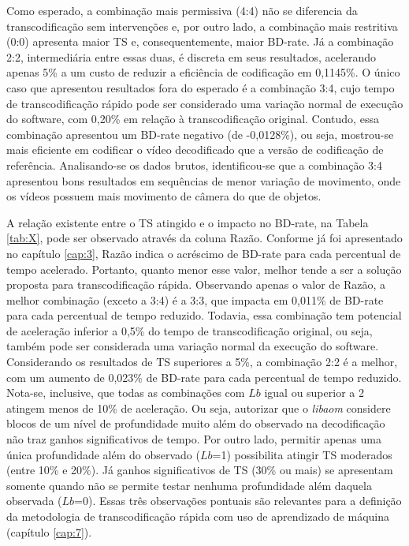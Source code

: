 Como esperado, a combinação mais permissiva (4:4) não se diferencia da transcodificação sem intervenções e, por outro lado, a combinação mais restritiva (0:0) apresenta maior TS e, consequentemente, maior BD-rate. Já a combinação 2:2, intermediária entre essas duas, é discreta em seus resultados, acelerando apenas 5\% a um custo de reduzir a eficiência de codificação em 0,1145\%. O único caso que apresentou resultados fora do esperado é a combinação 3:4, cujo tempo de transcodificação rápido pode ser considerado uma variação normal de execução do software, com 0,20\% em relação à transcodificação original. Contudo, essa combinação apresentou um BD-rate negativo (de -0,0128\%), ou seja, mostrou-se mais eficiente em codificar o vídeo decodificado que a versão de codificação de referência. Analisando-se os dados brutos, identificou-se que a combinação 3:4 apresentou bons resultados em sequências de menor variação de movimento, onde os vídeos possuem mais movimento de câmera do que de objetos.



A relação existente entre o TS atingido e o impacto no BD-rate, na Tabela \ref{tab:X}, pode ser observado através da coluna Razão. Conforme já foi apresentado no capítulo \ref{cap:3}, Razão indica o acréscimo de BD-rate para cada percentual de tempo acelerado. Portanto, quanto menor esse valor, melhor tende a ser a solução proposta para transcodificação rápida. Observando apenas o valor de Razão, a melhor combinação (exceto a 3:4) é a 3:3, que impacta em 0,011\% de BD-rate para cada percentual de tempo reduzido. Todavia, essa combinação tem potencial de aceleração inferior a 0,5\% do tempo de transcodificação original, ou seja, também pode ser considerada uma variação normal da execução do software. Considerando os resultados de TS superiores a 5\%, a combinação 2:2 é a melhor, com um aumento de 0,023\% de BD-rate para cada percentual de tempo reduzido. Nota-se, inclusive, que todas as combinações com $Lb$ igual ou superior a 2 atingem menos de 10\% de aceleração. Ou seja, autorizar que o \textit{libaom} considere blocos de um nível de profundidade muito além do observado na decodificação não traz ganhos significativos de tempo. Por outro lado, permitir apenas uma única profundidade além do observado ($Lb$=1) possibilita atingir TS moderados (entre 10\% e 20\%). Já ganhos significativos de TS (30\% ou mais) se apresentam somente quando não se permite testar nenhuma profundidade além daquela observada ($Lb$=0). Essas três observações pontuais são relevantes para a definição da metodologia de transcodificação rápida com uso de aprendizado de máquina (capítulo \ref{cap:7}).

